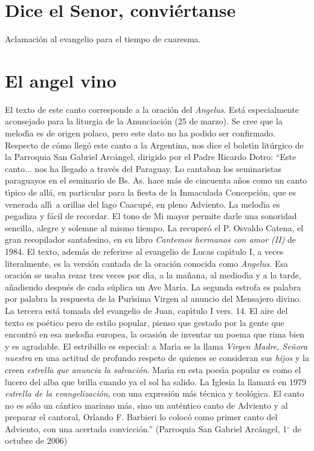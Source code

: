 \documentclass[landscape,12pt]{report}
\begin{document}
\section*{\small Dice el Senor, convi\'ertanse} \noindent\footnotesize 
Aclamaci\'on al evangelio para el tiempo de cuaresma. 
\section*{\small El angel vino} \noindent\footnotesize El texto de este canto corresponde a la oraci\'on del \textit{Angelus}. Est\'a especialmente aconsejado para la liturgia de la Anunciaci\'on (25 de marzo). Se cree que la melod\'\i a es de origen polaco, pero este dato no ha podido ser confirmado. Respecto de c\'omo lleg\'o este canto a la Argentina, nos dice el bolet\'\i n lit\'urgico de la Parroquia San Gabriel Arc\'angel, dirigido por el Padre Ricardo Dotro: ``Este canto... nos ha llegado a trav\'es del Paraguay. Lo cantaban los seminaristas paraguayos en el seminario de Bs. As. hace m\'as de cincuenta a\~nos como un canto t\'\i pico de all\'a, en particular para la fiesta de la Inmaculada Concepción, que es venerada all\'\i\ a orillas del lago Caacup\'e, en pleno Adviento. La melod\'\i a es pegadiza y f\'acil de recordar. El tono de Mi mayor permite darle una sonoridad sencilla, alegre y solemne al mismo tiempo. La recuper\'o el P. Osvaldo Catena, el gran recopilador santafesino, en su libro \textit{
Cantemos hermanos con amor (II)} de 1984. El texto, adem\'as de referirse al evangelio de Lucas cap\'\i tulo I, a veces literalmente, es la versi\'on cantada de la oraci\'on conocida como \textit{Angelus}. Esa oraci\'on se usaba rezar tres veces por d\'\i a, a la ma\~nana, al mediod\'\i a y a la tarde, a\~nadiendo despu\'es de cada s\'uplica un Ave María. La segunda estrofa es palabra por palabra la respuesta de la Pur\'\i sima Virgen al anuncio del Mensajero divino. La tercera est\'a tomada del evangelio de Juan, cap\'\i tulo I vers. 14. El aire del texto es po\'etico pero de estilo popular, pienso que gestado por la gente que encontr\'o en esa melod\'\i a europea, la ocasi\'on de inventar un poema que rima bien y es agradable. El estribillo es especial: a Mar\'\i a se la llama \textit{Virgen Madre, Se\~nora nuestra} en una actitud de profundo respeto de quienes se consideran sus \textit{hijos} y la creen \textit{estrella que anuncia la salvaci\'on}. Mar\'\i a en esta poes\'\i a popular es como el lucero 
del alba que brilla cuando ya el sol ha salido. La Iglesia la llamar\'a en 1979 \textit{estrella de la evangelización}, con una expresi\'on m\'as t\'ecnica y teol\'ogica. El canto no es s\'olo un c\'antico mariano m\'as, sino un aut\'entico canto de Adviento y al preparar el cantoral, Orlando F. Barbieri lo coloc\'o como primer canto del Adviento, con una acertada convicci\'on.'' (Parroquia San Gabriel Arc\'angel, 1$^\circ$ de octubre de 2006)
\end{document}

